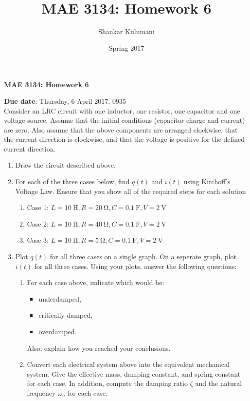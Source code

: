 \documentclass[11pt, reqno]{article}    %
\title{MAE 3134: Homework 6}
\author{Shankar Kulumani}
\date{Spring 2017}                          %
\begin{document}
{\noindent\Large \textbf{MAE 3134: Homework 6}}

\noindent \textbf{Due date}: Thursday, 6 April 2017, 0935 \\


Consider an LRC circuit with one inductor, one resistor, one capacitor and one voltage source.
Assume that the initial conditions (capacitor charge and current) are zero.
Also assume that the above components are arranged clockwise, that the current direction is clockwise, and that the voltage is positive for the defined current direction.

\begin{enumerate}
    \item Draw the circuit described above.
    \item For each of the three cases below, find \( q(t) \) and \( i(t)\) using Kirchoff's Voltage Law. 
    Ensure that you show all of the required steps for each solution
    \begin{enumerate}
        \item Case 1: \( L = \SI{10}{\henry}, R = \SI{20}{\ohm}, C = \SI{0.1}{\farad}, V = \SI{2}{\volt}\)
        \item Case 2: \( L = \SI{10}{\henry}, R = \SI{40}{\ohm}, C = \SI{0.1}{\farad}, V = \SI{2}{\volt}\)
        \item Case 3: \( L = \SI{10}{\henry}, R = \SI{5}{\ohm}, C = \SI{0.1}{\farad}, V = \SI{2}{\volt}\)
    \end{enumerate}
    \item Plot \( q(t) \) for all three cases on a single graph. 
    On a seperate graph, plot \( i(t) \) for all three cases.
    Using your plots, answer the following questions:
    \begin{enumerate}
        \item For each case above, indicate which would be:
        \begin{itemize}
            \item underdamped,
            \item critically damped,
            \item overdamped.
        \end{itemize}
        Also, explain how you reached your conclusions.
        \item Convert each electrical system above into the equivalent mechanical system. 
        Give the effective mass, damping constant, and spring constant for each case. 
        In addition, compute the damping ratio \( \zeta \) and the natural frequency \( \omega_n \) for each case.

\end{enumerate}
\end{enumerate}
\end{document}
